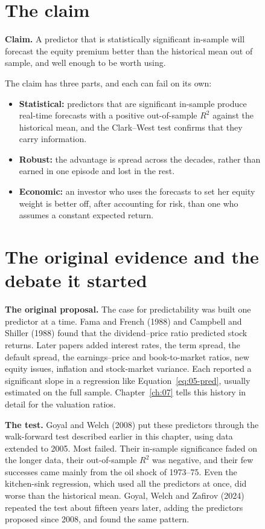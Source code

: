 \begin{figure}[htbp]
\section{The claim}
\label{sec:05-claim}

\begin{callout}
\textbf{Claim.} A predictor that is statistically significant in-sample will forecast the equity premium better than the historical mean out of sample, and well enough to be worth using.
\end{callout}

The claim has three parts, and each can fail on its own:

\begin{itemize}
  \item \textbf{Statistical:} predictors that are significant in-sample produce real-time forecasts with a positive out-of-sample $R^2$ against the historical mean, and the Clark--West test confirms that they carry information.
  \item \textbf{Robust:} the advantage is spread across the decades, rather than earned in one episode and lost in the rest.
  \item \textbf{Economic:} an investor who uses the forecasts to set her equity weight is better off, after accounting for risk, than one who assumes a constant expected return.
\end{itemize}

\section{The original evidence and the debate it started}
\label{sec:05-evidence}

\textbf{The original proposal.} The case for predictability was built one predictor at a time. Fama and French (1988) and Campbell and Shiller (1988) found that the dividend--price ratio predicted stock returns. Later papers added interest rates, the term spread, the default spread, the earnings--price and book-to-market ratios, new equity issues, inflation and stock-market variance. Each reported a significant slope in a regression like Equation~\eqref{eq:05-pred}, usually estimated on the full sample. Chapter~\ref{ch:07} tells this history in detail for the valuation ratios.

\textbf{The test.} Goyal and Welch (2008) put these predictors through the walk-forward test described earlier in this chapter, using data extended to 2005. Most failed. Their in-sample significance faded on the longer data, their out-of-sample $R^2$ was negative, and their few successes came mainly from the oil shock of 1973--75. Even the kitchen-sink regression, which used all the predictors at once, did worse than the historical mean. Goyal, Welch and Zafirov (2024) repeated the test about fifteen years later, adding the predictors proposed since 2008, and found the same pattern.


\end{figure}
